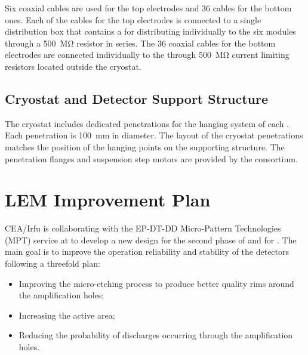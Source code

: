 Six coaxial cables are used for the top  electrodes and \num{36} cables for the bottom ones. Each of the cables for the top  electrodes is connected to a single distribution box that contains a  for distributing  individually to the six  modules through a \SI{500}{\mega\ohm} resistor in series. The \num{36} coaxial cables for the bottom  electrodes are connected individually to the  through \SI{500}{\mega\ohm} current limiting resistors located outside the cryostat.

\subsection{Cryostat and Detector Support Structure}
\label{sec:dp-crp-intfc-support}

The cryostat includes dedicated penetrations for the hanging system of each . Each penetration is \SI{100}{mm} in diameter. The layout of the cryostat penetrations matches the position of the hanging points on the  supporting structure. The penetration flanges and  suspension step motors are provided by the  consortium.
\section{LEM Improvement Plan}
\label{sec:dp-lem-ip}

CEA/Irfu is collaborating with the EP-DT-DD Micro-Pattern Technologies (MPT) service at  to develop a 
new  design for the second phase of  and for . The main goal is to improve the operation reliability and stability of the  detectors following a threefold plan:
\begin{itemize}
\item Improving the micro-etching process to produce better quality rims around the amplification holes;  
\item Increasing the  active area;
\item Reducing the probability of discharges occurring through the amplification holes.
\end{itemize}


